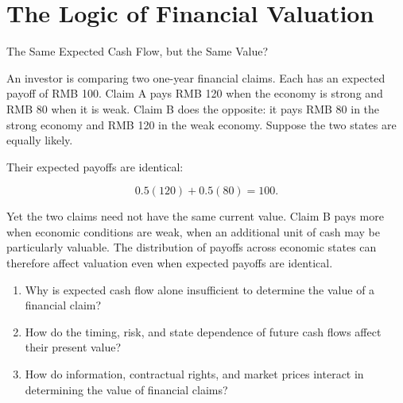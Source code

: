 \chapter{The Logic of Financial Valuation}
\label{chap:The_Logic_of_Financial_Valuation}

\begin{openingcase}{The Same Expected Cash Flow, but the Same Value?}

An investor is comparing two one-year financial claims. Each has an expected payoff of RMB 100. Claim A pays RMB 120 when the economy is strong and RMB 80 when it is weak. Claim B does the opposite: it pays RMB 80 in the strong economy and RMB 120 in the weak economy. Suppose the two states are equally likely.

Their expected payoffs are identical:

\[
0.5(120)+0.5(80)=100.
\]

Yet the two claims need not have the same current value. Claim B pays more when economic conditions are weak, when an additional unit of cash may be particularly valuable. The distribution of payoffs across economic states can therefore affect valuation even when expected payoffs are identical.

\end{openingcase}

\begin{tcolorbox}[
  enhanced,
  colback=FinanceBlue!6,
  colframe=FinanceBlue,
  boxrule=0.6pt,
  sharp corners,
  left=8pt,
  right=8pt,
  top=7pt,
  bottom=7pt,
  before skip=1em,
  after skip=1.6em,
  title=\textbf{Core Questions},
  coltitle=white,
  colbacktitle=FinanceBlue,
  fonttitle=\bfseries,
  attach boxed title to top left={xshift=6pt,yshift=-2mm},
  boxed title style={
    boxrule=0pt,
    sharp corners,
    left=5pt,
    right=5pt,
    top=2pt,
    bottom=2pt
  }
]
\begin{enumerate}[
  leftmargin=*,
  label=\textcolor{FinanceBlue}{\textbf{\arabic*.}},
  itemsep=0.55em,
  topsep=0.2em
]

\item Why is expected cash flow alone insufficient to determine the value of a financial claim?

\item How do the timing, risk, and state dependence of future cash flows affect their present value?

\item How do information, contractual rights, and market prices interact in determining the value of financial claims?

\end{enumerate}
\end{tcolorbox}


